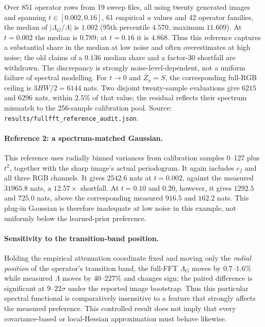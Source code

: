 \documentclass[10pt,journal]{IEEEtran}
\newcommand{\Lam}{\Lambda}
\begin{document}
Over 851 operator rows from 19 sweep files, all using twenty generated images and spanning
$t\in[0.002,0.16]$, 61 empirical $u$ values and 42 operator families, the median of
$|\Lam_G/\Lam|$ is $1.002$ (95th percentile $4.570$, maximum $11.609$). At $t=0.002$ the median
is $0.789$; at $t=0.16$ it is $4.868$. Thus this reference captures a substantial share in the
median at low noise and often overestimates at high noise; the old claims of a $0.136$ median
share and a factor-30 shortfall are withdrawn. The discrepancy is strongly noise-level-dependent,
not a uniform failure of spectral modelling. For $t\to0$ and $\bar Z_x=S$, the corresponding
full-RGB ceiling is $3HW/2=6144$ nats. Two disjoint twenty-sample evaluations give $6215$ and
$6296$ nats, within $2.5\%$ of that value; the residual reflects their spectrum mismatch to the
256-sample calibration pool. Source: \texttt{results/fullfft\_reference\_audit.json}.

\paragraph*{Reference 2: a spectrum-matched Gaussian.}
This reference uses radially binned variances from calibration samples 0--127 plus $t^2$,
together with the sharp image's actual periodogram. It again includes $c_f$ and all three RGB
channels. It gives $2542.6$ nats at $t=0.002$, against the measured $31965.8$ nats, a
$12.57\times$ shortfall. At $t=0.10$ and $0.20$, however, it gives $1292.5$ and $725.0$ nats,
above the corresponding measured $916.5$ and $162.2$ nats. This plug-in Gaussian is therefore
inadequate at low noise in this example, not uniformly below the learned-prior preference.

\paragraph*{Sensitivity to the transition-band position.}
Holding the empirical attenuation coordinate fixed and moving only the \emph{radial position}
of the operator's transition band, the full-FFT $\Lam_G$ moves by $0.7$--$1.6\%$ while measured
$\Lam$ moves by $40$--$227\%$ and changes sign; the paired difference is significant at
$9$--$22\sigma$ under the reported image bootstrap. Thus this particular spectral functional is
comparatively insensitive to a feature that strongly affects the measured preference. This
controlled result does not imply that every covariance-based or local-Hessian approximation must
behave likewise.
\end{document}
